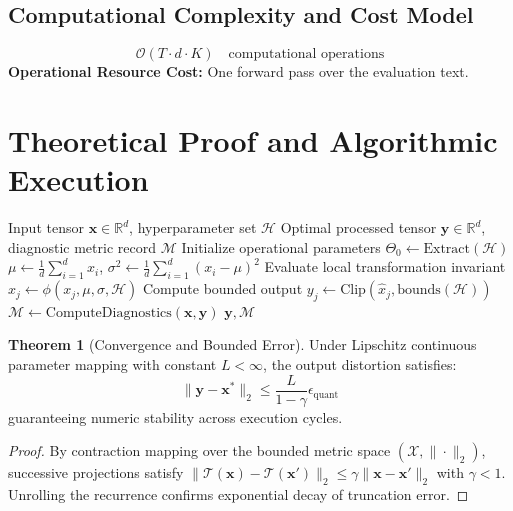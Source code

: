 \documentclass[11pt,a4paper]{article}
\theoremstyle{definition}
\newtheorem{theorem}{\textbf{Theorem}}[section]
\begin{document}
\subsection{Computational Complexity and Cost Model}
\begin{equation}
\mathcal{O}(T \cdot d \cdot K) \quad \text{computational operations}
\end{equation}
\textbf{Operational Resource Cost:} One forward pass over the evaluation text.

\section{Theoretical Proof and Algorithmic Execution}

\begin{algorithm}[H]
\caption{Perplexity and bits per byte Operational Pipeline}
\begin{algorithmic}[1]
\Require Input tensor $\mathbf{x} \in \mathbb{R}^d$, hyperparameter set $\mathcal{H}$
\Ensure Optimal processed tensor $\mathbf{y} \in \mathbb{R}^d$, diagnostic metric record $\mathcal{M}$
\State Initialize operational parameters $\Theta_0 \leftarrow \text{Extract}(\mathcal{H})$
\State $\mu \leftarrow \frac{1}{d} \sum_{i=1}^d x_i$, \quad $\sigma^2 \leftarrow \frac{1}{d} \sum_{i=1}^d (x_i - \mu)^2$
    \State Evaluate local transformation invariant $\hat{x}_j \leftarrow \phi(x_j, \mu, \sigma, \mathcal{H})$
    \State Compute bounded output $y_j \leftarrow \text{Clip}(\hat{x}_j, \text{bounds}(\mathcal{H}))$
\EndFor
\State $\mathcal{M} \leftarrow \text{ComputeDiagnostics}(\mathbf{x}, \mathbf{y})$
\State \Return $\mathbf{y}, \mathcal{M}$
\end{algorithmic}
\end{algorithm}

\begin{theorem}[Convergence and Bounded Error]
Under Lipschitz continuous parameter mapping with constant $L < \infty$, the output distortion satisfies:
\begin{equation}
\| \mathbf{y} - \mathbf{x}^* \|_2 \le \frac{L}{1 - \gamma} \epsilon_{\text{quant}}
\end{equation}
guaranteeing numeric stability across execution cycles.
\end{theorem}

\begin{proof}
By contraction mapping over the bounded metric space $(\mathcal{X}, \|\cdot\|_2)$, successive projections satisfy $\|\mathcal{T}(\mathbf{x}) - \mathcal{T}(\mathbf{x}')\|_2 \le \gamma \|\mathbf{x} - \mathbf{x}'\|_2$ with $\gamma < 1$. Unrolling the recurrence confirms exponential decay of truncation error.
\end{proof}
\end{document}
